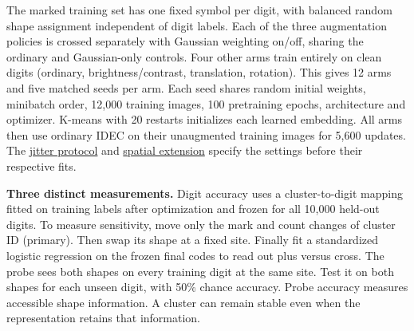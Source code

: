\newpage
{}
The marked training set has one fixed symbol per digit, with balanced random shape assignment independent of digit labels. Each of the three augmentation policies is crossed separately with Gaussian weighting on/off, sharing the ordinary and Gaussian-only controls. Four other arms train entirely on clean digits (ordinary, brightness/contrast, translation, rotation). This gives 12 arms and five matched seeds per arm. Each seed shares random initial weights, minibatch order, 12,000 training images, 100 pretraining epochs, architecture and optimizer. K-means with 20 restarts initializes each learned embedding. All arms then use ordinary IDEC on their unaugmented training images for 5,600 updates. The \href{https://github.com/JohnR31N/cs126FinalProj/blob/715521a/IDEC/photometric/design.md}{jitter protocol} and \href{https://github.com/JohnR31N/cs126FinalProj/blob/8e66ad4/IDEC/photometric/spatial_design.md}{spatial extension} specify the settings before their respective fits.

\textbf{Three distinct measurements.} Digit accuracy uses a cluster-to-digit mapping fitted on training labels after optimization and frozen for all 10,000 held-out digits. To measure sensitivity, move only the mark and count changes of cluster ID (primary). Then swap its shape at a fixed site. Finally fit a standardized logistic regression on the frozen final codes to read out plus versus cross. The probe sees both shapes on every training digit at the same site. Test it on both shapes for each unseen digit, with 50\% chance accuracy. Probe accuracy measures accessible shape information. A cluster can remain stable even when the representation retains that information.

\begin{center}\small\setlength{\tabcolsep}{3pt}\end{center}
\begin{center}\small\setlength{\tabcolsep}{3pt}\end{center}


